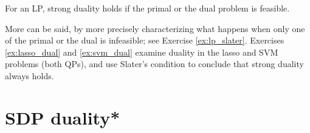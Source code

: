 \begin{Corollary}
\label{cor:slater_lp}
For an LP, strong duality holds if the primal or the dual problem is 
feasible. 
\end{Corollary}

More can be said, by more precisely characterizing what happens when only one of
the primal or the dual is infeasible; see Exercise \ref{ex:lp_slater}. Exercises
\ref{ex:lasso_dual} and \ref{ex:svm_dual} examine duality in the lasso and SVM
problems (both QPs), and use Slater's condition to conclude that strong duality
always holds.        

\section{SDP duality*}
\label{sec:sdp_duality}

